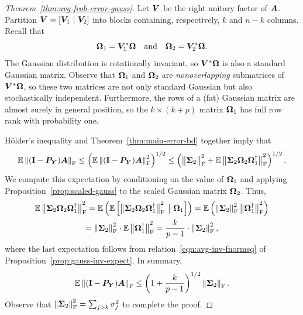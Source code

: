 \documentclass[final]{siamltex}
\begin{document}
\begin{proof}[Theorem~\ref{thm:avg-frob-error-gauss}]
Let $\mtx{V}$ be the right unitary factor of $\mtx{A}$.  Partition
$\mtx{V} = [ \mtx{V}_1 \ | \ \mtx{V}_2 ]$ into blocks containing,
respectively, $k$ and $n - k$ columns.  Recall that
$$
\mtx{\Omega}_1 = \mtx{V}_1^\adj \mtx{\Omega} \quad\text{and}\quad
\mtx{\Omega}_2 = \mtx{V}_2^\adj \mtx{\Omega}.
$$
The Gaussian distribution is rotationally invariant, so
$\mtx{V}^\adj \mtx{\Omega}$ is also a standard Gaussian matrix.
Observe that $\mtx{\Omega}_1$ and $\mtx{\Omega}_2$ are
\emph{nonoverlapping} submatrices of $\mtx{V}^\adj \mtx{\Omega}$, so
these two matrices are not only standard Gaussian but also
stochastically independent.  Furthermore, the rows of a (fat)
Gaussian matrix are almost surely in general position, so
the $k \times (k + p)$ matrix $\mtx{\Omega}_1$ has full row rank
with probability one.

H{\"o}lder's inequality and Theorem~\ref{thm:main-error-bd} together imply
that
$$
\Expect \fnorm{ (\Id - \mtx{P}_{\mtx{Y}}) \mtx{A}}
    \leq \left( \Expect \fnormsq{(\Id - \mtx{P}_{\mtx{Y}}) \mtx{A}} \right)^{1/2}
    \leq \left( \smnorm{\rm F}{\mtx{\Sigma}_2}^2 + \Expect \smnorm{\rm F}{ \mtx{\Sigma}_2
                \mtx{\Omega}_2 \mtx{\Omega}_1^\psinv }^2 \right)^{1/2}.
$$
We compute this expectation by conditioning on the value of $\mtx{\Omega}_1$ and
applying Proposition~\ref{prop:scaled-gauss} to the scaled Gaussian matrix $\mtx{\Omega}_2$.
Thus,
\begin{multline*}
\Expect \smnorm{\rm F}{ \mtx{\Sigma}_2 \mtx{\Omega}_2 \mtx{\Omega}_1^\psinv }^2
    = \Expect \left( \Expect \left[ \smnorm{\rm F}{ \mtx{\Sigma}_2 \mtx{\Omega}_2
\mtx{\Omega}_1^\psinv }^2 \ \big\vert \ \mtx{\Omega}_1 \right] \right)
    = \Expect \left( \fnormsq{\mtx{\Sigma}_2} \smnorm{\rm F}{\mtx{\Omega}_1^\psinv}^2 \right) \\
    = \fnormsq{\mtx{\Sigma}_2} \cdot \Expect \smnorm{\rm F}{\mtx{\Omega}_1^\psinv}^2
    = \frac{k}{p-1} \cdot \fnormsq{\mtx{\Sigma}_2},
\end{multline*}
where the last expectation follows from relation~\eqref{eqn:avg-inv-fnormsq}
of Proposition~\ref{prop:gauss-inv-expect}.  In summary,
$$
\Expect \fnorm{ (\Id - \mtx{P}_{\mtx{Y}}) \mtx{A}}
    \leq \left(1 + \frac{k}{p-1}\right)^{1/2} \fnorm{ \mtx{\Sigma}_2 }.
$$
Observe that $\fnormsq{\mtx{\Sigma}_2} = \sum_{j>k} \sigma_j^2$ to complete the proof.
\end{proof}
\end{document}
